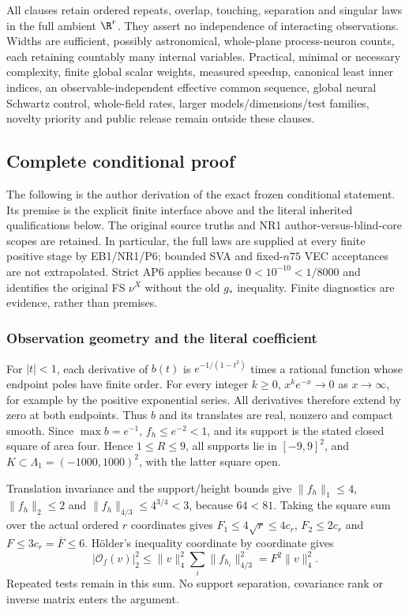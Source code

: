All clauses retain ordered repeats, overlap, touching, separation and singular
laws in the full ambient $\R^r$. They assert no independence of interacting
observations. Widths are sufficient, possibly astronomical, whole-plane
process-neuron counts, each retaining countably many internal variables.
Practical, minimal or necessary complexity, finite global scalar weights,
measured speedup, canonical least inner indices, an observable-independent
effective common sequence, global neural Schwartz control, whole-field rates,
larger models/dimensions/test families, novelty priority and public release
remain outside these clauses.

\subsection{Complete conditional proof}
\label{uda:proof}
The following is the author derivation of the exact frozen conditional
statement. Its premise is the explicit finite interface above and the literal
inherited qualifications below. The original source truths and NR1
author-versus-blind-core scopes are retained. In particular, the full laws
are supplied at every finite positive stage by EB1/NR1/P6; bounded SVA and
fixed-$n75$ VEC acceptances are not extrapolated. Strict AP6 applies because
$0<10^{-10}<1/8000$ and identifies the original FS $\nu^X$ without the old
$g_*$ inequality. Finite diagnostics are evidence, rather than premises.

\subsubsection{Observation geometry and the literal coefficient}
For $|t|<1$, each derivative of $b(t)$ is $e^{-1/(1-t^2)}$ times a rational
function whose endpoint poles have finite order. For every integer $k\ge0$,
$x^ke^{-x}\to0$ as $x\to\infty$, for example by the positive exponential
series. All derivatives therefore extend by zero at both endpoints.
Thus $b$ and its translates are real, nonzero and compact smooth. Since
$\max b=e^{-1}$, $f_h\le e^{-2}<1$, and its support is the stated closed
square of area four. Hence $1\le R\le9$, all supports lie in $[-9,9]^2$,
and $K\subset\Lambda_1=(-1000,1000)^2$, with the latter square open.

Translation invariance and the support/height bounds give
$\|f_h\|_1\le4$, $\|f_h\|_2\le2$ and
$\|f_h\|_{4/3}\le4^{3/4}<3$, because $64<81$.
Taking the square sum over the actual ordered $r$ coordinates gives
$F_1\le4\sqrt r\le4c_r$, $F_2\le2c_r$ and
$F\le3c_r=\overline F\le6$. H\"older's inequality coordinate by coordinate gives
\begin{equation}
 |\mathcal O_f(v)|_2^2\le\|v\|_4^2\sum_i\|f_{h_i}\|_{4/3}^2
 =F^2\|v\|_4^2.\tag{1.1}
\end{equation}
Repeated tests remain in this sum. No support separation, covariance rank
or inverse matrix enters the argument.

